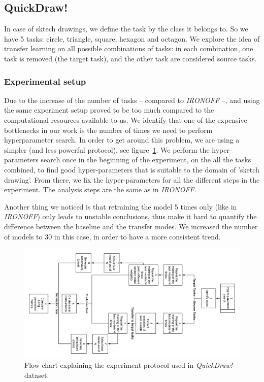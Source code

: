   \subsection{QuickDraw!}
    \par In case of sktech drawings, we define the task by the class it belongs to. So we have 5 tasks: circle, triangle, square, hexagon and octagon. We explore the idea of transfer learning on all possible combinations of tasks: in each combination, one task is removed (the target task), and the other task are considered source tasks.

    \subsubsection{Experimental setup}
    \par Due to the increase of the number of tasks -- compared to \textit{IRONOFF} --, and using the same experiment setup proved to be too much compared to the computational resources available to us. We identify that one of the expensive bottlenecks in our work is the number of times we need to perform hyperparameter search. In order to get around this problem, we are using a simpler (and less powerful protocol), see figure~\ref{fig:quickdraw_protocol}. We perform the hyper-parameters search once in the beginning of the experiment, on the all the tasks combined, to find good hyper-parameters that is suitable to the domain of 'sketch drawing'. From there, we fix the hyper-parameters for all the different steps in the experiment. The analysis steps are the same as in \textit{IRONOFF}.

    Another thing we noticed is that retraining the model 5 times only (like in \textit{IRONOFF}) only leads to unstable conclusions, thus make it hard to quantify the difference between the baseline and the transfer modes. We increased the number of models to 30 in this case, in order to have a more consistent trend.

    \begin{figure}
      \includegraphics[scale=0.3]{images/sota/quickdraw_results/QuickDraw_transfer_learning_flow.png}
      \caption{Flow chart explaining the experiment protocol used in \textit{QuickDraw!} dataset.}
      \label{fig:quickdraw_protocol}
    \end{figure}

